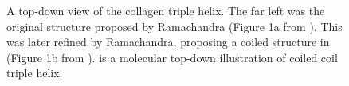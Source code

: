 \begin{figure}
\centering
{}                
\caption{A top-down view of the collagen triple helix. The far left  was the original structure proposed by Ramachandra \cite{Ramachandran1954} (Figure 1a from \cite{Bhattacharjee2005}). This was later refined by Ramachandra, proposing a coiled structure \cite{Ramachandran1955} in  (Figure 1b from \cite{Bhattacharjee2005}).  is a molecular top-down illustration of coiled coil triple helix. } 
\label{fig:top_down_view}
\end{figure}

